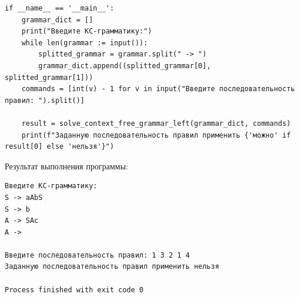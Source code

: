 \documentclass[a4paper,14pt]{extarticle}
\begin{document}
\begin{enumerate}[1.]
\begin{verbatim}
if __name__ == '__main__':
    grammar_dict = []
    print("Введите КС-грамматику:")
    while len(grammar := input()):
        splitted_grammar = grammar.split(" -> ")
        grammar_dict.append((splitted_grammar[0], splitted_grammar[1]))
    commands = [int(v) - 1 for v in input("Введите последовательность правил: ").split()]

    result = solve_context_free_grammar_left(grammar_dict, commands)
    print(f"Заданную последовательность правил применить {'можно' if result[0] else 'нельзя'}")

          \end{verbatim}
        Результат выполнения программы:
        \begin{verbatim}
Введите КС-грамматику:
S -> aAbS
S -> b
A -> SAc
A -> 

Введите последовательность правил: 1 3 2 1 4
Заданную последовательность правил применить нельзя

Process finished with exit code 0
  \end{verbatim}






\end{enumerate}
\end{document}
